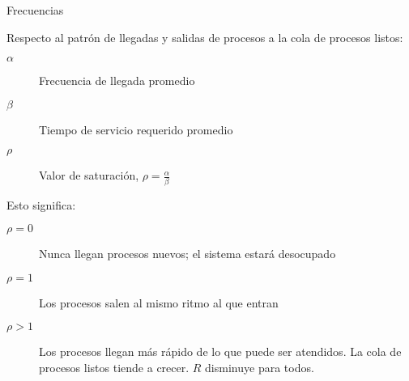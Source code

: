 \documentclass[presentation]{beamer}
\begin{document}
\begin{frame}[label={sec:orge4939a9}]{Frecuencias}
\begin{center}
Respecto al patrón de llegadas y salidas de procesos a la cola de
procesos listos:
\end{center}
\begin{description}
\item[{\(\alpha\)}] Frecuencia de llegada promedio
\item[{\(\beta\)}] Tiempo de servicio requerido promedio
\item[{\(\rho\)}] Valor de saturación, \(\rho = \frac{\alpha}{\beta}\)
\end{description}
\begin{center}
Esto significa:
\end{center}
\begin{description}
\item[{\(\rho = 0\)}] Nunca llegan procesos nuevos; el sistema estará desocupado
\item[{\(\rho = 1\)}] Los procesos salen al mismo ritmo al que entran
\item[{\(\rho > 1\)}] Los procesos llegan más rápido de lo que puede ser
atendidos. La cola de procesos listos tiende a
crecer. \(R\) disminuye para todos.
\end{description}
\end{frame}
\end{document}
